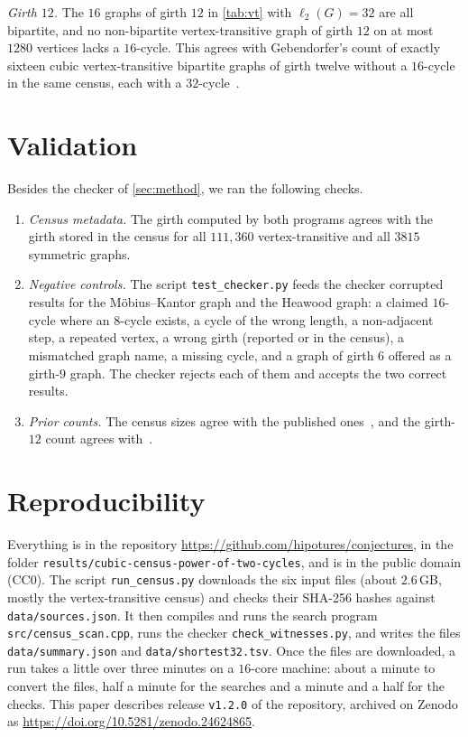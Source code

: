 \documentclass[11pt]{amsart}
\theoremstyle{remark}
\newcommand{\code}[1]{\texttt{#1}}
\newcommand{\sv}{\ell_2}
\begin{document}
\emph{Girth $12$.} The $16$ graphs of girth $12$ in \cref{tab:vt} with
$\sv(G)=32$ are all bipartite, and no non-bipartite vertex-transitive graph of
girth $12$ on at most $1280$ vertices lacks a $16$-cycle. This agrees with
Gebendorfer's count of exactly sixteen cubic vertex-transitive bipartite graphs
of girth twelve without a $16$-cycle in the same census, each with a
$32$-cycle~\cite{Gebendorfer2026}.

\section{Validation}\label{sec:validation}

Besides the checker of \cref{sec:method}, we ran the following checks.
\begin{enumerate}[label=(\alph*)]
\item \emph{Census metadata.} The girth computed by both programs agrees with
the girth stored in the census for all $111{,}360$ vertex-transitive and all
$3815$ symmetric graphs.
\item \emph{Negative controls.} The script \code{test\_checker.py} feeds the
checker corrupted results for the Möbius--Kantor graph and the Heawood graph: a
claimed $16$-cycle where an $8$-cycle exists, a cycle of the wrong length, a
non-adjacent step, a repeated vertex, a wrong girth (reported or in the
census), a mismatched graph name, a missing cycle, and a graph of girth $6$
offered as a girth-$9$ graph. The checker rejects each of them and accepts the
two correct results.
\item \emph{Prior counts.} The census sizes agree with the published
ones~\cite{PSV2013,ConderList,HoG}, and the girth-$12$ count agrees
with~\cite{Gebendorfer2026}.
\end{enumerate}

\section{Reproducibility}\label{sec:repro}

Everything is in the repository \url{https://github.com/hipotures/conjectures},
in the folder \code{results/}\allowbreak\code{cubic-census-power-of-two-cycles},
and is in the public domain (CC0). The script \code{run\_census.py} downloads the six input files (about
$2.6$\,GB, mostly the vertex-transitive census) and checks their SHA-256 hashes
against \code{data/sources.json}. It then compiles and runs the search program
\code{src/census\_scan.cpp}, runs the checker \code{check\_witnesses.py}, and
writes the files \code{data/summary.json} and \code{data/shortest32.tsv}. Once the
files are downloaded, a run takes a little over three minutes on a $16$-core
machine: about a minute to convert the files, half a minute for the searches
and a minute and a half for the checks. This paper describes release
\code{v1.2.0} of the repository, archived on Zenodo as \url{https://doi.org/10.5281/zenodo.24624865}.
\end{document}
